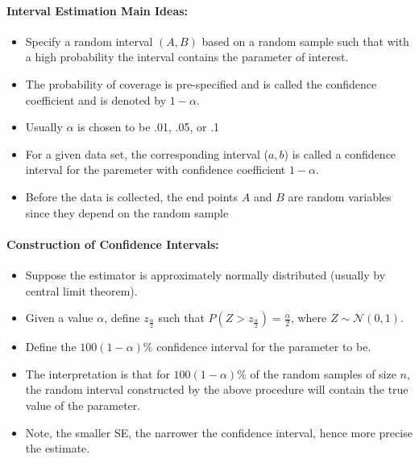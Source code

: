 \paragraph*{Interval Estimation Main Ideas:}
\begin{itemize}
    \item Specify a random interval $(A, B)$ based on a random sample such that with a high probability the interval contains the parameter of interest.
    \item The probability of coverage is pre-specified and is called the confidence coefficient and is denoted by $1-\alpha$.
    \item Usually $\alpha$ is chosen to be .01, .05, or .1
    \item For a given data set, the corresponding interval ($a, b$) is called a confidence interval for the paremeter with confidence coefficient $1-\alpha$.
    \item Before the data is collected, the end points $A$ and $B$ are random variables since they depend on the random sample
\end{itemize}

\paragraph*{Construction of Confidence Intervals:}
\begin{itemize}
    \item Suppose the estimator is approximately normally distributed (usually by central limit theorem).
    \item Given a value $\alpha$, define $z_{\frac{\alpha}{2}}$ such that $P(Z > z_{\frac{\alpha}{2}}) = \frac{\alpha}{2}$, where $Z \sim \mathcal{N}(0,1)$.
    \item Define the $100(1-\alpha)\%$ confidence interval for the parameter to be.
    \item The interpretation is that for $100(1-\alpha)\%$ of the random samples of size $n$, the random interval constructed by the above procedure will contain the true value of the parameter.
    \item Note, the smaller SE, the narrower the confidence interval, hence more precise the estimate.
\end{itemize}